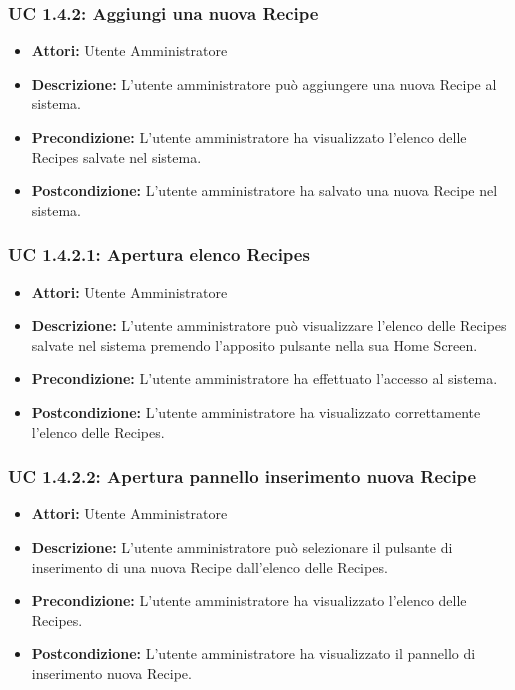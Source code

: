 \subsubsection{UC 1.4.2: Aggiungi una nuova Recipe}

\begin{itemize}
    \item \textbf{Attori:} Utente Amministratore
    \item \textbf{Descrizione:} L'utente amministratore può aggiungere una nuova Recipe al sistema.
    \item \textbf{Precondizione:} L'utente amministratore ha visualizzato l'elenco delle Recipes salvate nel sistema.
    \item \textbf{Postcondizione:} L'utente amministratore ha salvato una nuova Recipe nel sistema.
\end{itemize}

\subsubsection{UC 1.4.2.1: Apertura elenco Recipes}

\begin{itemize}
    \item \textbf{Attori:} Utente Amministratore
    \item \textbf{Descrizione:} L'utente amministratore può visualizzare l'elenco delle Recipes salvate nel sistema premendo l'apposito pulsante nella sua Home Screen.
    \item \textbf{Precondizione:} L'utente amministratore ha effettuato l'accesso al sistema.
    \item \textbf{Postcondizione:} L'utente amministratore ha visualizzato correttamente l'elenco delle Recipes.
\end{itemize}

\subsubsection{UC 1.4.2.2: Apertura pannello inserimento nuova Recipe}

\begin{itemize}
    \item \textbf{Attori:} Utente Amministratore
    \item \textbf{Descrizione:} L'utente amministratore può selezionare il pulsante di inserimento di una nuova Recipe dall'elenco delle Recipes.
    \item \textbf{Precondizione:} L'utente amministratore ha visualizzato l'elenco delle Recipes.
    \item \textbf{Postcondizione:} L'utente amministratore ha visualizzato il pannello di inserimento nuova Recipe.
\end{itemize}

